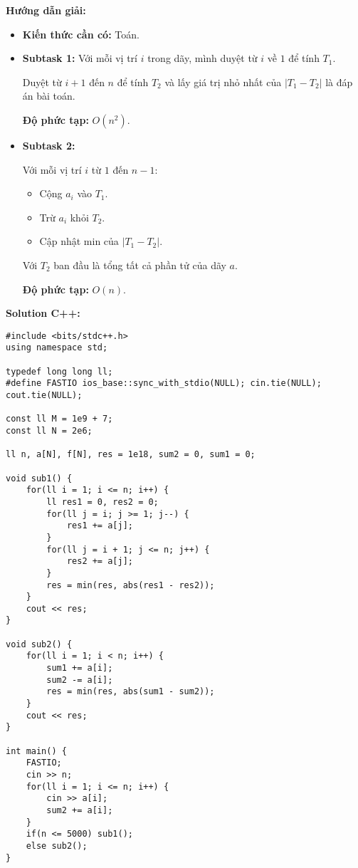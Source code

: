 \documentclass[12pt]{scrartcl}  %
\begin{document}
\textbf{Hướng dẫn giải:}
\begin{itemize}
    \item \textbf{Kiến thức cần có:} Toán.
    \item \textbf{Subtask 1:} Với mỗi vị trí $i$ trong dãy, mình duyệt từ $i$ về $1$ để
    tính $T_1$.
    
    Duyệt từ $i + 1$ đến $n$ để tính $T_2$ và lấy giá trị nhỏ nhất của $|T_1 - T_2|$ là đáp án bài toán.

    \textbf{Độ phức tạp:} $O(n^2)$.
    \item \textbf{Subtask 2:}
    
    Với mỗi vị trí $i$ từ $1$ đến $n - 1$:
    \begin{itemize}
        \item Cộng $a_i$ vào $T_1$.
        \item Trừ $a_i$ khỏi $T_2$.
        \item Cập nhật min của $|T_1 - T_2|$.
    \end{itemize}
    
    Với $T_2$ ban đầu là tổng tất cả phần tử của dãy $a$.

    \textbf{Độ phức tạp:} $O(n)$.
\end{itemize}

\textbf{Solution C++:}
\begin{lstlisting}
#include <bits/stdc++.h>
using namespace std;

typedef long long ll;
#define FASTIO ios_base::sync_with_stdio(NULL); cin.tie(NULL); cout.tie(NULL);

const ll M = 1e9 + 7;
const ll N = 2e6;

ll n, a[N], f[N], res = 1e18, sum2 = 0, sum1 = 0;

void sub1() {
    for(ll i = 1; i <= n; i++) {
        ll res1 = 0, res2 = 0;
        for(ll j = i; j >= 1; j--) {
            res1 += a[j];
        }
        for(ll j = i + 1; j <= n; j++) {
            res2 += a[j];
        }
        res = min(res, abs(res1 - res2));
    }
    cout << res;
}

void sub2() {
    for(ll i = 1; i < n; i++) {
        sum1 += a[i];
        sum2 -= a[i];
        res = min(res, abs(sum1 - sum2));
    }
    cout << res;
}

int main() {
    FASTIO;
    cin >> n;
    for(ll i = 1; i <= n; i++) {
        cin >> a[i];
        sum2 += a[i];
    }
    if(n <= 5000) sub1();
    else sub2();
}
\end{lstlisting}
\end{document}
